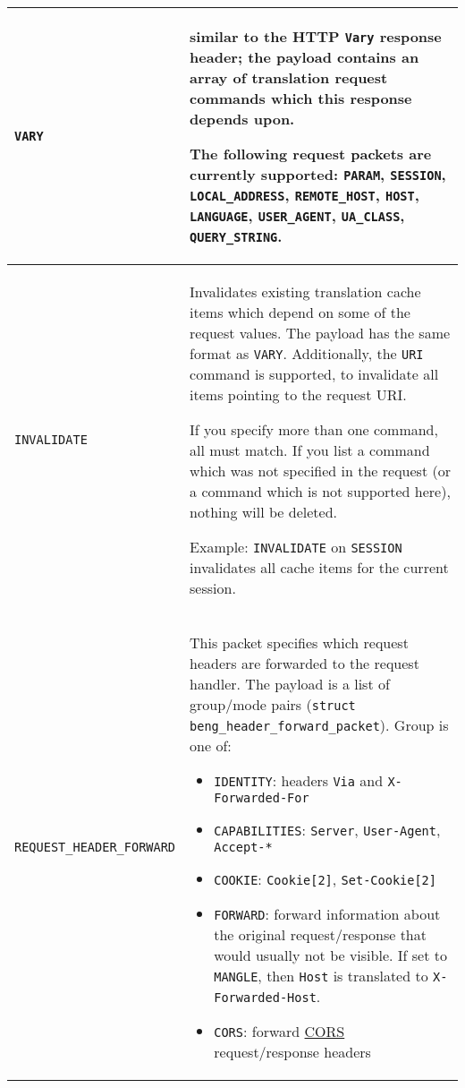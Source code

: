 \documentclass[a4paper,12pt]{article}
\begin{document}
\begin{longtable}{|l|p{8cm}|}
\hline

\verb|VARY| & similar to the HTTP \texttt{Vary} response header;
the payload contains an array of translation request commands which
this response depends upon.

The following request packets are currently supported:
\verb|PARAM|,
\verb|SESSION|,
\verb|LOCAL_ADDRESS|,
\verb|REMOTE_HOST|, \verb|HOST|, \verb|LANGUAGE|,
\verb|USER_AGENT|, \verb|UA_CLASS|, \verb|QUERY_STRING|.

\\

\hline

\verb|INVALIDATE| & Invalidates existing translation cache items
which depend on some of the request values.  The payload has the same
format as \verb|VARY|.  Additionally, the \verb|URI| command is
supported, to invalidate all items pointing to the request URI.

If you specify more than one command, all must match.  If you list a
command which was not specified in the request (or a command which is
not supported here), nothing will be deleted.

Example: \verb|INVALIDATE| on \verb|SESSION| invalidates all cache
items for the current session.

\\

\hline

\label{tfwdheader}
\verb|REQUEST_HEADER_FORWARD| &

This packet specifies which request headers are forwarded to the
request handler.  The payload is a list of group/mode pairs
(\texttt{struct beng\_header\_forward\_packet}).  Group is one of:

\begin{itemize}
\item \texttt{IDENTITY}: headers \texttt{Via} and
  \texttt{X-Forwarded-For}
\item \texttt{CAPABILITIES}: \texttt{Server}, \texttt{User-Agent},
  \texttt{Accept-*}
\item \texttt{COOKIE}: \texttt{Cookie[2]}, \texttt{Set-Cookie[2]}

\item \texttt{FORWARD}: forward information about the original
  request/response that would usually not be visible.  If set to
  \verb|MANGLE|, then \texttt{Host} is translated to
  \texttt{X-Forwarded-Host}.

\item \texttt{CORS}: forward
  \href{http://www.w3.org/TR/cors/#syntax}{CORS} request/response
  headers


\end{itemize}
\end{longtable}
\end{document}
